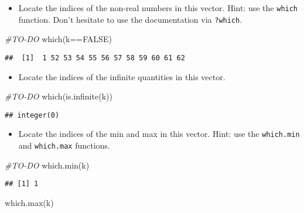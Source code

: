 \documentclass[
]{article}
\newenvironment{Shaded}{\begin{snugshade}}{\end{snugshade}}
\newcommand{\CommentTok}[1]{\textcolor[rgb]{0.56,0.35,0.01}{\textit{#1}}}
\newcommand{\ConstantTok}[1]{\textcolor[rgb]{0.00,0.00,0.00}{#1}}
\newcommand{\FunctionTok}[1]{\textcolor[rgb]{0.00,0.00,0.00}{#1}}
\newcommand{\NormalTok}[1]{#1}
\newcommand{\SpecialCharTok}[1]{\textcolor[rgb]{0.00,0.00,0.00}{#1}}
\providecommand{\tightlist}{%
  \setlength{\itemsep}{0pt}\setlength{\parskip}{0pt}}
\begin{document}
\begin{itemize}
\tightlist
\item
  Locate the indices of the non-real numbers in this vector. Hint: use
  the \texttt{which} function. Don't hesitate to use the documentation
  via \texttt{?which}.
\end{itemize}

\begin{Shaded}
\begin{Highlighting}[]
\CommentTok{\#TO{-}DO}
\FunctionTok{which}\NormalTok{(k}\SpecialCharTok{==}\ConstantTok{FALSE}\NormalTok{)}
\end{Highlighting}
\end{Shaded}

\begin{verbatim}
##  [1]  1 52 53 54 55 56 57 58 59 60 61 62
\end{verbatim}

\begin{itemize}
\tightlist
\item
  Locate the indices of the infinite quantities in this vector.
\end{itemize}

\begin{Shaded}
\begin{Highlighting}[]
\CommentTok{\#TO{-}DO}
\FunctionTok{which}\NormalTok{(}\FunctionTok{is.infinite}\NormalTok{(k))}
\end{Highlighting}
\end{Shaded}

\begin{verbatim}
## integer(0)
\end{verbatim}

\begin{itemize}
\tightlist
\item
  Locate the indices of the min and max in this vector. Hint: use the
  \texttt{which.min} and \texttt{which.max} functions.
\end{itemize}

\begin{Shaded}
\begin{Highlighting}[]
\CommentTok{\#TO{-}DO}
\FunctionTok{which.min}\NormalTok{(k)}
\end{Highlighting}
\end{Shaded}

\begin{verbatim}
## [1] 1
\end{verbatim}

\begin{Shaded}
\begin{Highlighting}[]
\FunctionTok{which.max}\NormalTok{(k)}
\end{Highlighting}
\end{Shaded}
\end{document}
